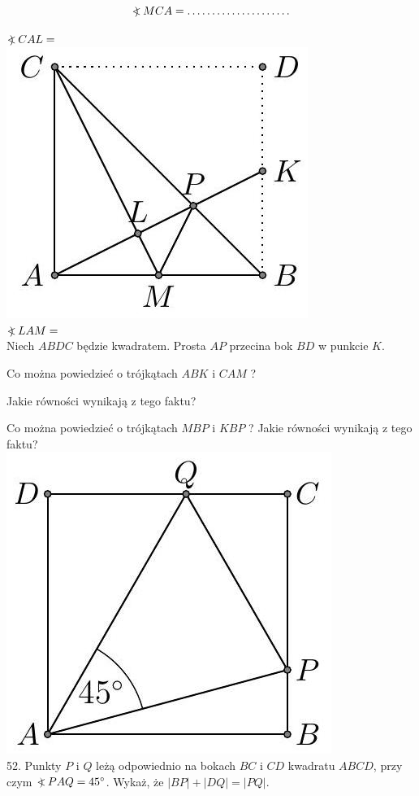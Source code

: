 \documentclass[10pt]{article}
\newcommand\Varangle{\mathop{{<\!\!\!\!\!\text{\small)}}\:}\nolimits}
\begin{document}
\[
\Varangle M C A=\ldots \ldots \ldots \ldots \ldots \ldots \ldots
\]

\(\Varangle C A L=\)\\
\includegraphics[max width=\textwidth, center]{2024_11_21_71f62bd117d375398909g-056}\\
\(\Varangle L A M=\)\\
Niech \(A B D C\) będzie kwadratem. Prosta \(A P\) przecina bok \(B D\) w punkcie \(K\).

Co można powiedzieć o trójkątach \(A B K\) i \(C A M\) ?

Jakie równości wynikają z tego faktu?

Co można powiedzieć o trójkątach \(M B P\) i \(K B P\) ? Jakie równości wynikają z tego faktu?\\
\includegraphics[max width=\textwidth, center]{2024_11_21_71f62bd117d375398909g-057}\\
52. Punkty \(P\) i \(Q\) leżą odpowiednio na bokach \(B C\) i \(C D\) kwadratu \(A B C D\), przy czym \(\Varangle P A Q=45^{\circ}\). Wykaż, że \(|B P|+|D Q|=|P Q|\).
\end{document}
